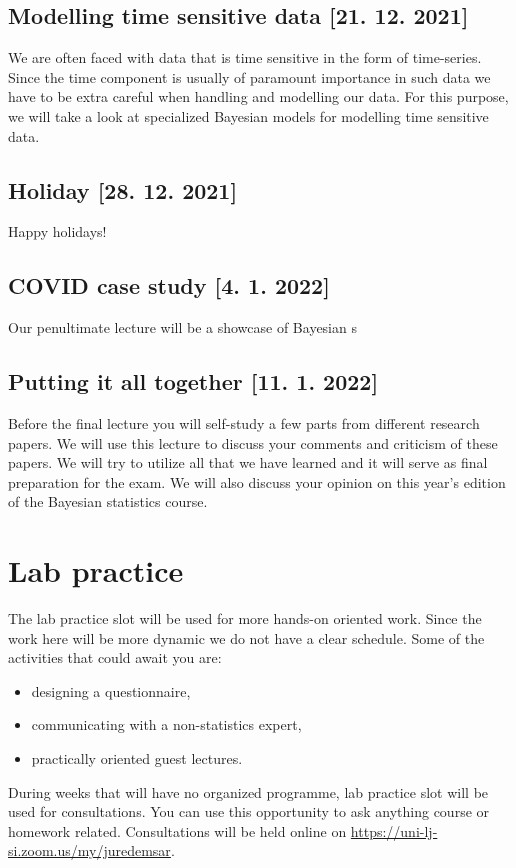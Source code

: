 \documentclass[fleqn,moreauthors,10pt]{ds_report}
\begin{document}
\subsection*{Modelling time sensitive data [21. 12. 2021]}

We are often faced with data that is time sensitive in the form of time-series. Since the time component is usually of paramount importance in such data we have to be extra careful when handling and modelling our data. For this purpose, we will take a look at specialized Bayesian models for modelling time sensitive data.

\subsection*{Holiday [28. 12. 2021]}

Happy holidays!

\subsection*{COVID case study [4. 1. 2022]}

Our penultimate lecture will be a showcase of Bayesian s

\subsection*{Putting it all together [11. 1. 2022]}

Before the final lecture you will self-study a few parts from different research papers. We will use this lecture to discuss your comments and criticism of these papers. We will try to utilize all that we have learned and it will serve as final preparation for the exam. We will also discuss your opinion on this year's edition of the Bayesian statistics course.

\section*{Lab practice}

The lab practice slot will be used for more hands-on oriented work. Since the work here will be more dynamic we do not have a clear schedule. Some of the activities that could await you are:

\begin{itemize}
	\item designing a questionnaire,
	\item communicating with a non-statistics expert,
	\item practically oriented guest lectures.
\end{itemize}

During weeks that will have no organized programme, lab practice slot will be used for consultations. You can use this opportunity to ask anything course or homework related. Consultations will be held online on \url{https://uni-lj-si.zoom.us/my/juredemsar}.
\end{document}
